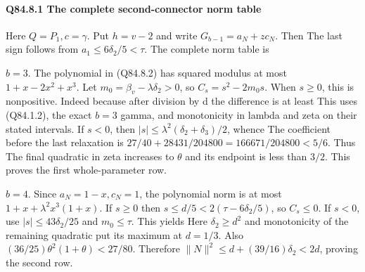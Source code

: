 \paragraph{Q84.8.1 The complete second-connector norm table}

Here \(Q=P_1,\allowbreak  c=\gamma\). Put \(h=v-2\) and write \(G_{b-1}=a_N+zc_N\).
Then
The last sign follows from \(a_1\le6\delta_2/5<\tau\).
The complete norm table is

\(b=3\). The polynomial in (Q84.8.2) has squared modulus at most
\(1+x-2x^2+x^3\). Let \(m_0=\beta_v-\lambda \delta_2>0\), so
\(C_s=s^2-2m_0s\). When \(s\ge 0\), this is nonpositive. Indeed
because after division by d the difference is at least
This uses (Q84.1.2), the exact \(b=3\) gamma, and monotonicity in lambda and
zeta on their stated intervals. If \(s<0\), then
\(|s|\le\lambda^2(\delta_2+\delta_3)/2\), whence
The coefficient before the last relaxation is
\(27/40+28431/204800=166671/204800<5/6\).
Thus
The final quadratic in zeta increases to \(\theta\) and its endpoint is less
than \(3/2\). This proves the first whole-parameter row.

\(b=4\). Since \(a_N=1-x,\allowbreak  c_N=1\), the polynomial norm is at most
\(1+x+\lambda^2x^3(1+x)\). If \(s\ge 0\) then
\(s\le d/5<2(\tau-6\delta_2/5)\), so \(C_s\le 0\). If \(s<0\), use
\(|s|\le43\delta_2/25\) and \(m_0\le\tau\). This yields
Here \(\delta_2\ge d^2\) and monotonicity of the remaining quadratic put its maximum
at \(d=1/3\). Also
\((36/25)\theta^2(1+\theta)<27/80\). Therefore
\(\|N\|^2\le d+(39/16)\delta_2<2d\), proving the second row.

